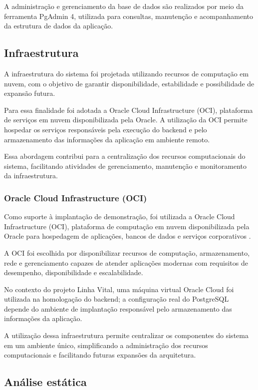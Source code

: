 A administração e gerenciamento da base de dados são realizados por meio da ferramenta PgAdmin 4, utilizada para consultas, manutenção e acompanhamento da estrutura de dados da aplicação.

\subsection{Infraestrutura}

A infraestrutura do sistema foi projetada utilizando recursos de computação em nuvem, com o objetivo de garantir disponibilidade, estabilidade e possibilidade de expansão futura.

Para essa finalidade foi adotada a Oracle Cloud Infrastructure (OCI), plataforma de serviços em nuvem disponibilizada pela Oracle. A utilização da OCI permite hospedar os serviços responsáveis pela execução do backend e pelo armazenamento das informações da aplicação em ambiente remoto.

Essa abordagem contribui para a centralização dos recursos computacionais do sistema, facilitando atividades de gerenciamento, manutenção e monitoramento da infraestrutura.

\subsubsection{Oracle Cloud Infrastructure (OCI)}

Como suporte à implantação de demonstração, foi utilizada a Oracle Cloud Infrastructure (OCI), plataforma de computação em nuvem disponibilizada pela Oracle para hospedagem de aplicações, bancos de dados e serviços corporativos \cite{oracleoci2026}.

A OCI foi escolhida por disponibilizar recursos de computação, armazenamento, rede e gerenciamento capazes de atender aplicações modernas com requisitos de desempenho, disponibilidade e escalabilidade.

No contexto do projeto Linha Vital, uma máquina virtual Oracle Cloud foi utilizada na homologação do backend; a configuração real do PostgreSQL depende do ambiente de implantação responsável pelo armazenamento das informações da aplicação.

A utilização dessa infraestrutura permite centralizar os componentes do sistema em um ambiente único, simplificando a administração dos recursos computacionais e facilitando futuras expansões da arquitetura.

\subsection{Análise estática}

